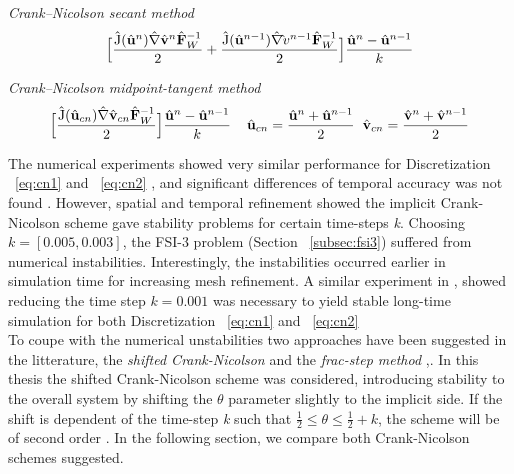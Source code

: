 \begin{discr}
\textit{Crank–Nicolson secant method }
\begin{align*}
\Big[\frac{\text{\^{J}}(\hat{\mathbf{u}}^{n}) \hat{\mathbf{\nabla}} \hat{\mathbf{v}}^{n} \hat{\mathbf{F}}_W^{-1}}{2} 
+ \frac{\text{\^{J}}(\hat{\mathbf{u}}^{n-1}) \hat{\mathbf{\nabla}} \hat{\mathbf{}}v^{n-1} \hat{\mathbf{F}}_W^{-1}}{2} \Big] 
\frac{\hat{\mathbf{u}}^{n} - \hat{\mathbf{u}}^{n-1}}{k}
\end{align*} 
\label{eq:cn1}
\end{discr}

\begin{discr}
\textit{Crank–Nicolson midpoint-tangent method}
\begin{align*}
\Big[\frac{\text{\^{J}}(\hat{\mathbf{u}}_{cn}) \hat{\mathbf{\nabla}} \hat{\mathbf{v}}_{cn} \hat{\mathbf{F}}_W^{-1}}{2} \Big] 
\frac{\hat{\mathbf{u}}^{n} - \hat{\mathbf{u}}^{n-1}}{k} \hspace{4mm}
\hat{\mathbf{u}}_{cn} = \frac{\hat{\mathbf{u}}^{n} + \hat{\mathbf{u}}^{n-1}}{2} \hspace{2mm}
\hat{\mathbf{v}}_{cn} = \frac{\hat{\mathbf{v}}^{n} + \hat{\mathbf{v}}^{n-1}}{2}
\end{align*} 
\label{eq:cn2}
\end{discr}

The numerical experiments showed very similar performance for Discretization  ~\ref{eq:cn1} and ~\ref{eq:cn2} , and significant differences of temporal accuracy was not found \cite{Richter2015}. However, spatial and temporal refinement showed the implicit Crank-Nicolson scheme gave stability problems for certain time-steps \textit{k}. Choosing $k = [0.005, 0.003]$, the FSI-3 problem (Section  ~\ref{subsec:fsi3}) suffered from numerical instabilities. Interestingly, the instabilities occurred earlier in simulation time for increasing mesh refinement. A similar experiment in  \cite{Wicka}, showed reducing the time step $k = 0.001$ was necessary to yield stable long-time simulation for both  Discretization  ~\ref{eq:cn1} and ~\ref{eq:cn2}    \\

To coupe with the numerical unstabilities two approaches have been suggested in the litterature,  the \textit{shifted Crank-Nicolson}  and the \textit{frac-step method}  \cite{Richter2015, Wicka, Wick2013a},.  In this thesis the shifted Crank-Nicolson scheme was considered, introducing stability to the overall system by shifting the $\theta$ parameter slightly to the implicit side. If the shift is dependent of the time-step \textit{k} such that $\frac{1}{2} \leq \theta \leq \frac{1}{2} + k$, the scheme will be of second order \cite{Richter2015}. In the following section, we compare both Crank-Nicolson schemes suggested. \\




